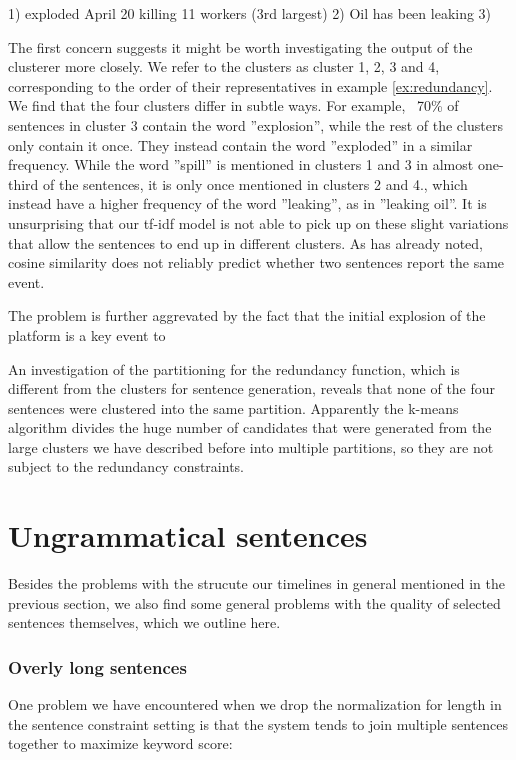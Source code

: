 \documentclass[a4paper,BCOR=10mm]{report}
\numberwithin{lemma}{chapter}
\numberwithin{definition}{chapter}
\begin{document}
1) exploded April 20 killing 11 workers
(3rd largest)
2) Oil has been leaking
3)

The first concern suggests it might be worth investigating the output of the clusterer more closely.
We refer to the clusters as cluster 1, 2, 3 and 4, corresponding to the order of their representatives in example \ref{ex:redundancy}.
We find that the four clusters differ in subtle ways.
For example, ~70\% of sentences in cluster 3 contain the word ''explosion'', while the rest of the clusters only contain it once. They instead contain the word ''exploded'' in a similar frequency.
While the word ''spill'' is mentioned in clusters 1 and 3 in almost one-third of the sentences, it is only once mentioned in clusters 2 and 4., which instead have a higher frequency of the word ''leaking'', as in ''leaking oil''.
It is unsurprising that our tf-idf model is not able to pick up on these slight variations that allow the sentences to end up in different clusters. As \citet{chieu} has already noted, cosine similarity does not reliably predict whether two sentences report the same event.

The problem is further aggrevated by the fact that the initial explosion of the platform is a key event to 


An investigation of the partitioning for the redundancy function, which is different from the clusters for sentence generation, reveals that none of the four sentences were clustered into the same partition. Apparently the k-means algorithm divides the huge number of candidates that were generated from the large clusters we have described before into multiple partitions, so they are not subject to the redundancy constraints.

\section{Ungrammatical sentences} \label{sec:errors-grammar}

Besides the problems with the strucute our timelines in general mentioned in the previous section, we also find some general problems with the quality of selected sentences themselves, which we outline here.

\subsubsection{Overly long sentences}

One problem we have encountered when we drop the normalization for length in the sentence constraint setting is that the system tends to join multiple sentences together to maximize keyword score:
\end{document}
